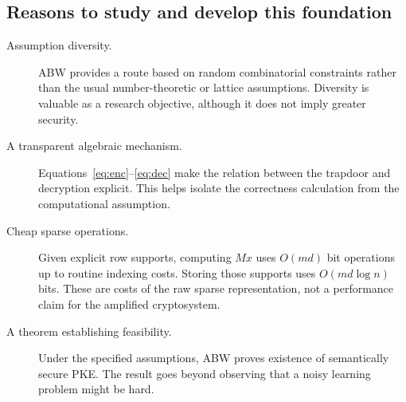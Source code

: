\documentclass[11pt,a4paper]{article}
\begin{document}
\subsection{Reasons to study and develop this foundation}
\begin{description}
\item[Assumption diversity.] ABW provides a route based on random combinatorial constraints rather than the usual number-theoretic or lattice assumptions. Diversity is valuable as a research objective, although it does not imply greater security.
\item[A transparent algebraic mechanism.] Equations~\eqref{eq:enc}--\eqref{eq:dec} make the relation between the trapdoor and decryption explicit. This helps isolate the correctness calculation from the computational assumption.
\item[Cheap sparse operations.] Given explicit row supports, computing $Mx$ uses $O(md)$ bit operations up to routine indexing costs. Storing those supports uses $O(md\log n)$ bits. These are costs of the raw sparse representation, not a performance claim for the amplified cryptosystem.
\item[A theorem establishing feasibility.] Under the specified assumptions, ABW proves existence of semantically secure PKE. The result goes beyond observing that a noisy learning problem might be hard.
\end{description}
\end{document}
